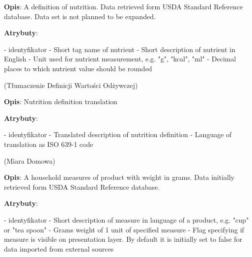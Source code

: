 \begin{enumerate}[label={\textbf{KAT/\protect\threedigits{\theenumi}}}, wide, labelwidth=!, labelindent=0pt, labelsep=0pt, series=reqs]
    \textbf{Opis}: A definition of nutrition. Data retrieved form USDA Standard Reference database. Data set is not planned to be expanded.
    \par
    \textbf{Atrybuty}:
    \begin{itemize}[series=atr, wide, align=left, leftmargin=190pt]
         \label{kat:NutritionDefinition:id} - identyfikator
         \label{kat:NutritionDefinition:tag} - Short tag name of nutrient
         \label{kat:NutritionDefinition:description} - Short description of nutrient in English
         \label{kat:NutritionDefinition:units} - Unit used for nutrient measurement, e.g. "g", "kcal", "ml"
         \label{kat:NutritionDefinition:decimalPlaces} - Decimal places to which nutrient value should be rounded
    \end{itemize}

     \label{kat:NutritionDefinitionTranslation} (Tłumaczenie Definicji Wartości Odżywczej)

    \textbf{Opis}: Nutrition definition translation
    \par
    \textbf{Atrybuty}:
    \begin{itemize}[series=atr, wide, align=left, leftmargin=190pt]
         \label{kat:NutritionDefinitionTranslation:id} - identyfikator
         \label{kat:NutritionDefinitionTranslation:translation} - Translated description of nutrition definition
         \label{kat:NutritionDefinitionTranslation:language} - Language of translation as ISO 639-1 code
    \end{itemize}

     \label{kat:HouseholdMeasure} (Miara Domowa)

    \textbf{Opis}: A household measures of product with weight in grams. Data initially retrieved form USDA Standard Reference database.
    \par
    \textbf{Atrybuty}:
    \begin{itemize}[series=atr, wide, align=left, leftmargin=190pt]
         \label{kat:HouseholdMeasure:id} - identyfikator
         \label{kat:HouseholdMeasure:description} - Short description of measure in language of a product, e.g. "cup" or "tea spoon"
         \label{kat:HouseholdMeasure:gramsWeight} - Grams weight of 1 unit of specified measure
         \label{kat:HouseholdMeasure:isVisible} - Flag specifying if measure is visible on presentation layer. By default it is initially set to false for data imported from external sources
    \end{itemize}


\end{enumerate}
